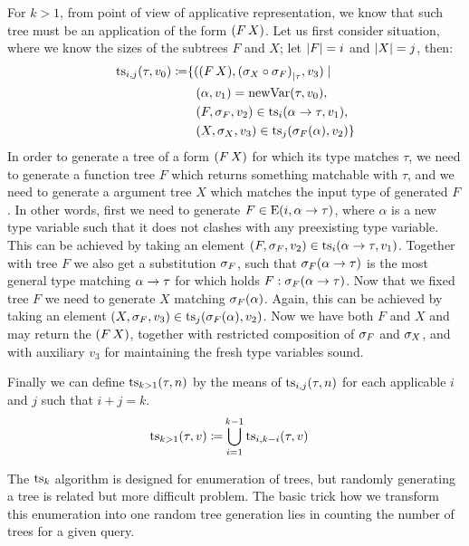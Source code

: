 \documentclass{ws-ijait}
\begin{document}
For $k > 1$, from point of view of applicative representation, we know that such tree must be an application of the form $(F\,X)$. Let us first consider situation, where we know the sizes of the subtrees $F$ and $X$; let $\lvert F \rvert = i$ and $\lvert X \rvert = j$, then:
\begin{align*}
\operatorname{ts}_{i,j}(\tau,v_0) \coloneqq& \{ ((F\,X), {(\sigma_{X} \circ \sigma_{F})}_{\mid \tau}, v_3) \mid \\ 
  & ~~ (\alpha, v_1) = \operatorname{newVar}(\tau,v_0), \\
  & ~~ (F,\sigma_{F},v_2) \in \operatorname{ts}_{i}(\alpha \rightarrow \tau,v_1), \\
  & ~~ (X,\sigma_{X},v_3) \in \operatorname{ts}_{j}(\sigma_{F}(\alpha), v_2) 
\}
\end{align*}
In order to generate a tree of a form $(F\,X)$ for which its type matches $\tau$, 
we need to generate a function tree $F$ which returns something matchable with $\tau$, and 
we need to generate a argument tree $X$ which matches the input type of generated $F$.
In other words, first we need to generate $F \in \operatorname{E}(i,\alpha \rightarrow \tau)$, where $\alpha$ is a new
type variable such that it does not clashes with any preexisting type variable.
This can be achieved by taking an element $(F,\sigma_F,v_2) \in \operatorname{ts}_{i}(\alpha \rightarrow \tau,v_1)$.
Together with tree $F$ we also get a substitution $\sigma_F$, such that 
$\sigma_F(\alpha \rightarrow \tau)$ is the most general type matching $\alpha \rightarrow \tau$ 
for which holds $F : \sigma_F(\alpha \rightarrow \tau)$. 
Now that we fixed tree $F$ we need to generate $X$ matching $\sigma_F(\alpha)$.
Again, this can be achieved by taking an element $(X,\sigma_{F},v_3) \in \operatorname{ts}_{j}(\sigma_F(\alpha),v_2)$.
Now we have both $F$ and $X$ and may return the $(F\,X)$, together with 
restricted composition of $\sigma_{F}$ and $\sigma_{X}$, and with auxiliary $v_3$ for maintaining the fresh type variables sound.

Finally we can define $\operatorname{ts}_{k > 1}(\tau,n)$ by the means of $\operatorname{ts}_{i,j}(\tau,n)$ 
for each applicable $i$ and $j$ such that $i+j = k$.
\begin{align*}
\operatorname{ts}_{k > 1}(\tau,v) \coloneqq& \bigcup\limits_{i=1}^{k-1}  \operatorname{ts}_{i,k-i}(\tau, v)
\end{align*}



The $\operatorname{ts}_k$ algorithm is designed for enumeration of trees, but randomly generating a tree is related but more difficult problem. The basic trick how we transform this enumeration into one random tree generation lies in counting the number of trees for a given query.
\end{document}
